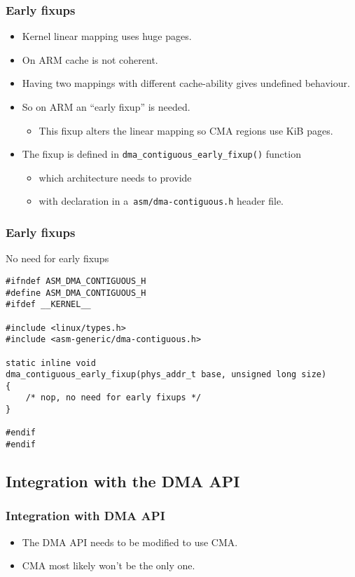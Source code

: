 \begin{frame}
  \frametitle{Early fixups}

  \begin{itemize}
  \item Kernel linear mapping uses huge pages.
  \item On ARM cache is not coherent.
  \item Having two mappings with different cache-ability gives
    undefined behaviour.
  \item So on ARM an “early fixup” is needed.
    \begin{itemize}
    \item This fixup alters the linear mapping so CMA regions use
      \unit[4]{KiB} pages.
    \end{itemize}
  \item The fixup is defined in
    \lstinline|dma_contiguous_early_fixup()| function
    \begin{itemize}
    \item which architecture needs to provide
    \item with declaration in a~\lstinline|asm/dma-contiguous.h| header file.
    \end{itemize}
  \end{itemize}
\end{frame}

\begin{frame}[fragile]
  \frametitle{Early fixups}

  \begin{block}{No need for early fixups}
\begin{lstlisting}
#ifndef ASM_DMA_CONTIGUOUS_H
#define ASM_DMA_CONTIGUOUS_H
#ifdef __KERNEL__

#include <linux/types.h>
#include <asm-generic/dma-contiguous.h>

static inline void
dma_contiguous_early_fixup(phys_addr_t base, unsigned long size)
{
    /* nop, no need for early fixups */
}

#endif
#endif
\end{lstlisting}
  \end{block}
\end{frame}

\subsection{Integration with the DMA API}

\begin{frame}
  \frametitle{Integration with DMA API}

  \begin{itemize}
  \item The DMA API needs to be modified to use CMA.
  \item CMA most likely won't be the only one.
  \end{itemize}
\end{frame}

